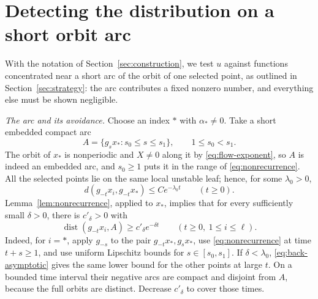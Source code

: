 \documentclass[12pt]{article}
\theoremstyle{remark}
\newcommand{\dist}{\operatorname{dist}}
\begin{document}
\section{Detecting the distribution on a short orbit arc}
\label{sec:detection}

With the notation of Section~\ref{sec:construction}, we test
\(u\) against functions concentrated near a short arc of the orbit of
one selected point, as outlined in Section~\ref{sec:strategy}: the
arc contributes a fixed nonzero number, and everything else must be
shown negligible.

\emph{The arc and its avoidance.}
Choose an index \(*\) with \(\alpha_*\ne0\).
Take a short embedded compact arc
\[
 A=\{g_sx_*:s_0\le s\le s_1\},\qquad 1\le s_0<s_1 .
\]
The orbit of \(x_*\) is nonperiodic and \(X\ne0\) along it by
\eqref{eq:flow-exponent}, so \(A\) is indeed
an embedded arc, and \(s_0\ge1\) puts it in the range of
\eqref{eq:nonrecurrence}.
All the selected points lie on the same local unstable leaf; hence, for
some \(\lambda_0>0\),
\begin{equation}\label{eq:back-asymptotic}
 d(g_{-t}x_i,g_{-t}x_*)\le Ce^{-\lambda_0t}
                           \qquad(t\ge0).
\end{equation}
Lemma~\ref{lem:nonrecurrence}, applied to \(x_*\), implies that for
every sufficiently small \(\delta>0\), there is \(c'_\delta>0\) with
\begin{equation}\label{eq:arc-avoid}
 \dist(g_{-t}x_i,A)\ge c'_\delta e^{-\delta t}
                   \qquad(t\ge0,\ 1\le i\le\ell).
\end{equation}
Indeed, for \(i=*\), apply \(g_{-s}\) to the pair
\(g_{-t}x_*,g_sx_*\), use \eqref{eq:nonrecurrence} at time \(t+s\ge1\),
and use uniform Lipschitz bounds for \(s\in[s_0,s_1]\).
If \(\delta<\lambda_0\), \eqref{eq:back-asymptotic} gives the same
lower bound for the other points at large \(t\).
On a bounded time interval their negative arcs are compact and
disjoint from \(A\), because the full orbits are distinct.
Decrease \(c'_\delta\) to cover those times.
\end{document}

